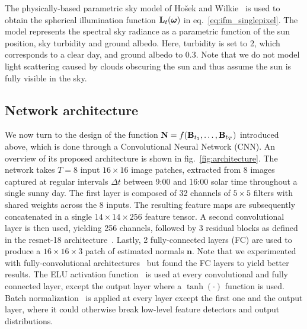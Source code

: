 
The physically-based parametric sky model of Ho\v{s}ek and Wilkie~\cite{hosek-siggraph-12} is used to obtain the spherical illumination function ${\bf L}_t(\mathbf{\boldsymbol \omega})$ in eq.~\eqref{eq:ifm_singlepixel}. The model represents the spectral sky radiance as a parametric function of the sun position, sky turbidity and ground albedo. Here, turbidity is set to 2, which corresponds to a clear day, and ground albedo to 0.3. Note that we do not model light scattering caused by clouds obscuring the sun and thus assume the sun is fully visible in the sky.

\subsection{Network architecture}
\label{sec:architecture}

We now turn to the design of the function ${\bf N} = f({\bf B}_{t_1}, \ldots, {\bf B}_{t_T})$ introduced above, which is done through a Convolutional Neural Network (CNN). An overview of its proposed architecture is shown in fig.~\ref{fig:architecture}. The network takes $T=8$ input $16 \times 16$ image patches, extracted from 8 images captured at regular intervals $\Delta t$ between 9:00 and 16:00 solar time throughout a single sunny day. The first layer is composed of 32 channels of $5 \times 5$ filters with shared weights across the 8 inputs. The resulting feature maps are subsequently concatenated in a single $14 \times 14 \times 256$ feature tensor. A second convolutional layer is then used, yielding 256 channels, followed by 3 residual blocks as defined in the resnet-18 architecture~\cite{he-cvpr-16}. Lastly, 2 fully-connected layers (FC) are used to produce a $16 \times 16 \times 3$ patch of estimated normals $\mathbf{n}$. Note that we experimented with fully-convolutional architectures~\cite{taniai-arxiv-18} but found the FC layers to yield better results. The ELU activation function~\cite{clevert-iclr-16} is used at every convolutional and fully connected layer, except the output layer where a $\tanh(\cdot)$ function is used. Batch normalization~\cite{ioffe-jmlr-15} is applied at every layer except the first one and the output layer, where it could otherwise break low-level feature detectors and output distributions.


